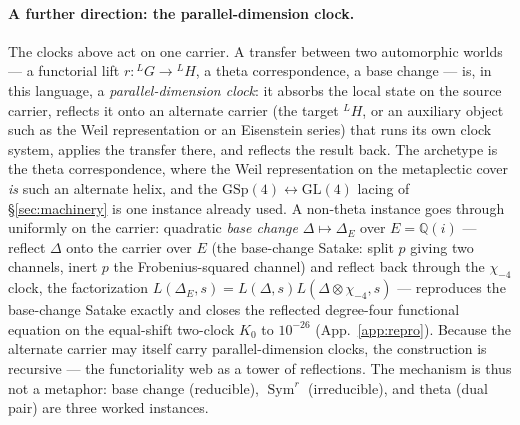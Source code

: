 \documentclass[11pt]{article}
\theoremstyle{definition}
\newcommand{\Sym}{\operatorname{Sym}}
\begin{document}
\paragraph{A further direction: the parallel-dimension clock.} The clocks above act on one carrier. A
transfer between two automorphic worlds --- a functorial lift $r:{}^{L}G\to{}^{L}H$, a theta
correspondence, a base change --- is, in this language, a \emph{parallel-dimension clock}: it absorbs the
local state on the source carrier, reflects it onto an alternate carrier (the target ${}^{L}H$, or an
auxiliary object such as the Weil representation or an Eisenstein series) that runs its own clock system,
applies the transfer there, and reflects the result back. The archetype is the theta correspondence, where
the Weil representation on the metaplectic cover \emph{is} such an alternate helix, and the
$\mathrm{GSp}(4)\leftrightarrow\mathrm{GL}(4)$ lacing of \S\ref{sec:machinery} is one instance already
used. A non-theta instance goes through uniformly on the carrier: quadratic \emph{base change}
$\Delta\mapsto\Delta_E$ over $E=\mathbb Q(i)$ --- reflect $\Delta$ onto the carrier over $E$ (the
base-change Satake: split $p$ giving two channels, inert $p$ the Frobenius-squared channel) and reflect
back through the $\chi_{-4}$ clock, the factorization $L(\Delta_E,s)=L(\Delta,s)L(\Delta\otimes\chi_{-4},s)$
--- reproduces the base-change Satake exactly and closes the reflected degree-four functional equation on
the equal-shift two-clock $K_0$ to $10^{-26}$ (App.~\ref{app:repro}). Because the alternate carrier may
itself carry parallel-dimension clocks, the construction is recursive --- the functoriality web as a tower
of reflections. The mechanism is thus not a metaphor: base change (reducible), $\Sym^r$ (irreducible), and
theta (dual pair) are three worked instances.
\end{document}

